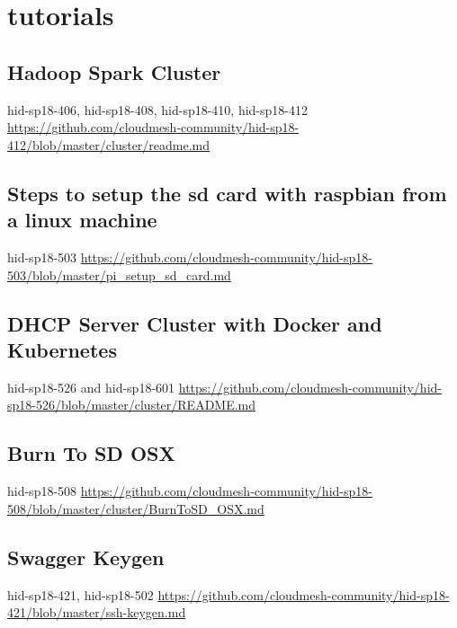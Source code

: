 \chapter{tutorials}

\section{Hadoop Spark Cluster }
hid-sp18-406,  hid-sp18-408, hid-sp18-410, hid-sp18-412
\url{https://github.com/cloudmesh-community/hid-sp18-412/blob/master/cluster/readme.md}

 
\section{Steps to setup the sd card with raspbian from a linux machine}
hid-sp18-503 
\url{https://github.com/cloudmesh-community/hid-sp18-503/blob/master/pi_setup_sd_card.md}


\section{DHCP Server Cluster with Docker and Kubernetes }
hid-sp18-526 and hid-sp18-601
\url{https://github.com/cloudmesh-community/hid-sp18-526/blob/master/cluster/README.md}

\section{Burn To SD OSX}
hid-sp18-508
\url{https://github.com/cloudmesh-community/hid-sp18-508/blob/master/cluster/BurnToSD_OSX.md}

\section{Swagger Keygen}
hid-sp18-421, hid-sp18-502
\url{https://github.com/cloudmesh-community/hid-sp18-421/blob/master/ssh-keygen.md}
